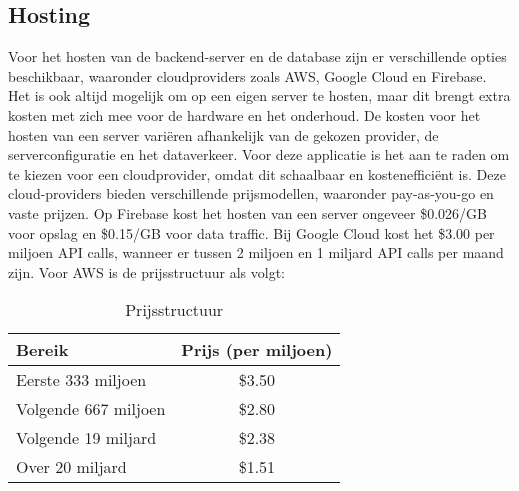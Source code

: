     \subsection{Hosting}

    Voor het hosten van de backend-server en de database zijn er verschillende opties beschikbaar, waaronder cloudproviders zoals AWS, Google Cloud en Firebase.
    Het is ook altijd mogelijk om op een eigen server te hosten, maar dit brengt extra kosten met zich mee voor de hardware en het onderhoud.
    De kosten voor het hosten van een server variëren afhankelijk van de gekozen provider, de serverconfiguratie en het dataverkeer.
    Voor deze applicatie is het aan te raden om te kiezen voor een cloudprovider, omdat dit schaalbaar en kostenefficiënt is.
    Deze cloud-providers bieden verschillende prijsmodellen, waaronder pay-as-you-go en vaste prijzen.
    Op Firebase kost het hosten van een server ongeveer \$0.026/GB voor opslag en \$0.15/GB voor data traffic.
    Bij Google Cloud kost het \$3.00 per miljoen API calls, wanneer er tussen 2 miljoen  en 1 miljard API calls per maand zijn.
    Voor AWS is de prijsstructuur als volgt:
    \begin{table}[h]
        \centering
        \begin{tabular}{lc}
        \toprule
        \textbf{Bereik} & \textbf{Prijs (per miljoen)} \\
        \midrule
        Eerste 333 miljoen & \$3.50 \\
        Volgende 667 miljoen & \$2.80 \\
        Volgende 19 miljard & \$2.38 \\
        Over 20 miljard & \$1.51 \\
        \bottomrule
        \end{tabular}
        \caption{Prijsstructuur}
        \label{tab:prijsstructuur}
    \end{table}






